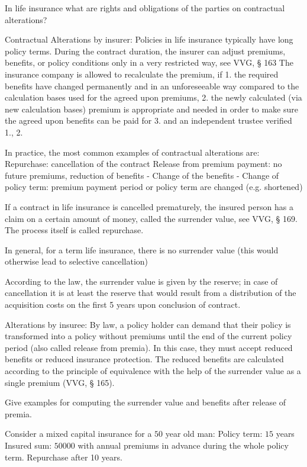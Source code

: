 \documentclass[11pt,a4paper,twoside]{article}
\begin{document}
In life insurance what are rights and obligations of the parties on contractual alterations?


Contractual Alterations by insurer:
Policies in life insurance typically have long policy terms. During the contract duration,
the insurer can adjust premiums, benefits, or policy conditions only in a very restricted
way, see VVG, § 163
The insurance company is allowed to recalculate the premium, if
1. the required benefits have changed permanently and in an unforeseeable way compared to
the calculation bases used for the agreed upon premiums,
2. the newly calculated (via new calculation bases) premium is appropriate and needed in
order to make sure the agreed upon benefits can be paid for
3. and an independent trustee verified 1., 2.

In practice, the most common examples of contractual alterations are:
Repurchase: cancellation of the contract
Release from premium payment: no future premiums, reduction of benefits
- Change of the benefits
- Change of policy term: premium payment period or policy term are changed (e.g. shortened)

If a contract in life insurance is cancelled prematurely, the insured person has a claim on a
certain amount of money, called the surrender value, see VVG, § 169. The process itself is called repurchase.

In general, for a term life insurance, there is no surrender value (this would otherwise lead to selective cancellation)

According to the law, the surrender value is given by the reserve; in case of cancellation
it is at least the reserve that would result from a distribution of the acquisition costs on the
first 5 years upon conclusion of contract.


Alterations by insuree:
By law, a policy holder can demand that their policy is transformed into a policy without
premiums until the end of the current policy period (also called release from premia).
In this case, they must accept reduced benefits or reduced insurance protection.
The reduced benefits are calculated according to the principle of equivalence with the
help of the surrender value as a single premium (VVG, § 165).



Give examples for computing the surrender value and benefits after release of premia.

Consider a mixed capital insurance for a \( 50 \) year old man:
Policy term: \( 15 \) years
Insured sum: \( 50 000 \)
with annual premiums in advance during the whole policy term.
Repurchase after 10 years.
\end{document}
